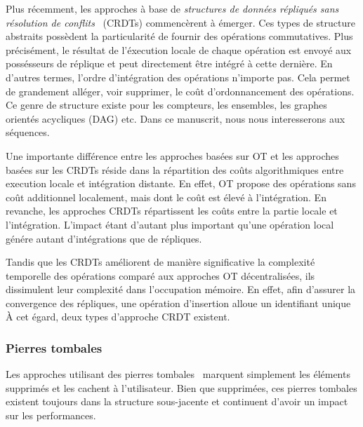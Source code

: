 Plus récemment, les approches à base de \emph{structures de données répliqués
  sans résolution de conflits}~\cite{shapiro2011comprehensive,
  shapiro2011conflict} (CRDTs) commencèrent à émerger. Ces types de structure
abstraits possèdent la particularité de fournir des opérations commutatives.
Plus précisément, le résultat de l'éxecution locale de chaque opération est
envoyé aux possésseurs de réplique et peut directement être intégré à cette
dernière.  En d'autres termes, l'ordre d'intégration des opérations n'importe
pas. Cela permet de grandement alléger, voir supprimer, le coût d'ordonnancement
des opérations. Ce genre de structure existe pour les compteurs, les ensembles,
les graphes orientés acycliques (DAG) etc. Dans ce manuscrit, nous nous
interesserons aux séquences.

Une importante différence entre les approches basées sur OT et les approches
basées sur les CRDTs réside dans la répartition des coûts algorithmiques entre
execution locale et intégration distante. En effet, OT propose des opérations
sans coût additionnel localement, mais dont le coût est élevé à l'intégration.
En revanche, les approches CRDTs répartissent les coûts entre la partie locale
et l'intégration.  L'impact étant d'autant plus important qu'une opération local
génére autant d'intégrations que de répliques.

Tandis que les CRDTs améliorent de manière significative la complexité
temporelle des opérations comparé aux approches OT décentralisées, ils
dissimulent leur complexité dans l'occupation mémoire. En effet, afin d'assurer
la convergence des répliques, une opération d'insertion alloue un identifiant
unique  À cet égard, deux types d'approche CRDT existent.

\subsubsection{Pierres tombales}

Les approches utilisant des pierres tombales~\cite{ahmed2011evaluating,
  conway2014language, grishchenko2010deep, oster2006data,
  preguica2009commutative, roh2011replicated, weiss2007wooki, wu2010partial,
  Yu2012stringwise} marquent simplement les éléments supprimés et les cachent à
l'utilisateur. Bien que supprimées, ces pierres tombales existent toujours dans
la structure sous-jacente et continuent d'avoir un impact sur les performances.

